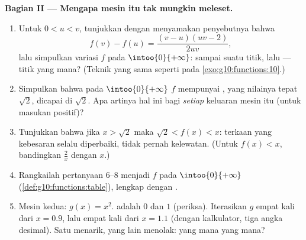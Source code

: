\begin{problem}
\medskip
\noindent\textbf{Bagian II --- Mengapa mesin itu tak mungkin meleset.}
\begin{enumerate}[resume]
  \item Untuk $0 < u < v$, tunjukkan dengan menyamakan
        penyebutnya bahwa
        \[
        f(v) - f(u) = \frac{(v - u)(uv - 2)}{2uv} ,
        \]
        lalu simpulkan variasi $f$ pada
        $\intoo{0}{+\infty}$:  sampai suatu titik, lalu
         --- titik yang mana? (Teknik yang sama seperti pada
        \cref{exo:g10:functions:10}.)
  \item Simpulkan bahwa pada $\intoo{0}{+\infty}$  $f$ mempunyai
        , yang nilainya tepat $\sqrt2$, dicapai di
        $\sqrt2$. Apa artinya hal ini bagi \emph{setiap} keluaran
        mesin itu (untuk masukan positif)?
  \item Tunjukkan bahwa jika $x > \sqrt2$ maka
        $\sqrt2 < f(x) < x$: terkaan yang kebesaran selalu diperbaiki,
        tidak pernah kelewatan. (Untuk $f(x) < x$, bandingkan $\frac2x$ dengan
        $x$.)
  \item Rangkailah pertanyaan 6--8 menjadi  $f$
        pada $\intoo{0}{+\infty}$
        (\cref{def:g10:functions:table}), lengkap dengan .
  \item Mesin kedua: $g(x) = x^2$.  adalah
        $0$ dan $1$ (periksa). Iterasikan $g$ empat kali dari
        $x = 0.9$, lalu empat kali dari $x = 1.1$ (dengan kalkulator,
        tiga angka desimal). Satu  menarik, yang lain
        menolak: yang mana yang mana?
\end{enumerate}


\end{problem}
